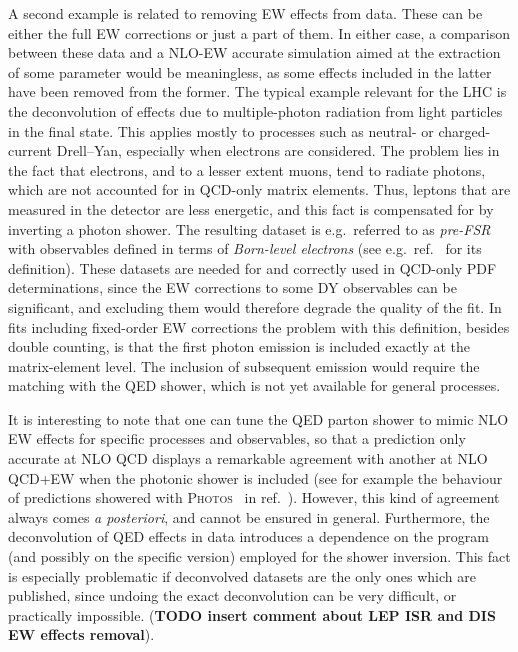 A second example is related to removing EW effects from data. These can be either the full EW corrections
or just a part of them. In either case, a comparison between these data and a NLO-EW accurate simulation aimed at the extraction of some parameter would be meaningless, as some effects included in the latter
have been removed from the former. The typical example relevant for the LHC is the deconvolution of effects due to multiple-photon radiation
from light particles in the final state. This applies mostly
to processes such as neutral- or charged-current Drell--Yan, especially when electrons are considered. The problem lies in the fact that
 electrons, and to a lesser extent muons, tend to radiate photons, which are not accounted
for in QCD-only matrix elements. Thus, leptons that are measured in the detector are less energetic, and this fact is compensated for
by inverting a photon shower. The resulting dataset is e.g.\ referred to as \emph{pre-FSR} with observables defined in terms of \emph{Born-level electrons} (see e.g.\ ref.~\cite{Aad:2015auj} for its definition).
These datasets are needed for and correctly used in QCD-only PDF determinations, since the EW corrections to some DY observables can be significant, and excluding them would therefore degrade the quality of the fit.
In fits including fixed-order EW corrections the problem with this definition, besides double counting, is that the first photon emission is included exactly at the matrix-element level. The inclusion of
subsequent emission would require the matching with the QED shower, which is not yet available for general processes.

It is interesting
to note that one can tune the QED parton shower to mimic NLO EW effects for specific processes and observables, so that a prediction only accurate at NLO
QCD displays a remarkable agreement with another at NLO QCD+EW when the photonic shower is included (see for example the behaviour of predictions showered with
\textsc{Photos}~\cite{Barberio:1990ms,Barberio:1993qi,Golonka:2005pn} in ref.~\cite{CarloniCalame:2016ouw}). However, this kind of agreement
always comes \emph{a posteriori}, and cannot be ensured in general.
Furthermore, the deconvolution of QED effects in data introduces a dependence on the program (and possibly on 
the specific version) employed for the shower inversion. 
This fact is especially problematic if deconvolved datasets are the only ones which are published, since undoing the exact deconvolution can be very difficult, or practically impossible.
(\textbf{TODO insert comment about LEP ISR and DIS EW effects removal}).

